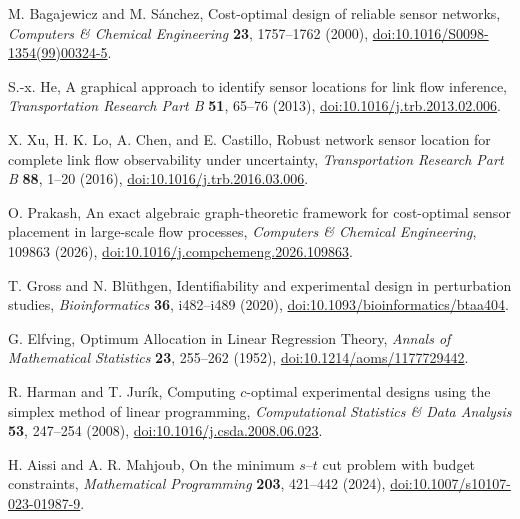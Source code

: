 
M. Bagajewicz and M. S\'anchez,
Cost-optimal design of reliable sensor networks,
\emph{Computers \& Chemical Engineering} \textbf{23}, 1757--1762 (2000),
\href{https://doi.org/10.1016/S0098-1354(99)00324-5}{doi:10.1016/S0098-1354(99)00324-5}.

S.-x. He,
A graphical approach to identify sensor locations for link flow inference,
\emph{Transportation Research Part B} \textbf{51}, 65--76 (2013),
\href{https://doi.org/10.1016/j.trb.2013.02.006}{doi:10.1016/j.trb.2013.02.006}.

X. Xu, H. K. Lo, A. Chen, and E. Castillo,
Robust network sensor location for complete link flow observability under uncertainty,
\emph{Transportation Research Part B} \textbf{88}, 1--20 (2016),
\href{https://doi.org/10.1016/j.trb.2016.03.006}{doi:10.1016/j.trb.2016.03.006}.

O. Prakash,
An exact algebraic graph-theoretic framework for cost-optimal sensor placement
in large-scale flow processes,
\emph{Computers \& Chemical Engineering}, 109863 (2026),
\href{https://doi.org/10.1016/j.compchemeng.2026.109863}{doi:10.1016/j.compchemeng.2026.109863}.

T. Gross and N. Bl\"uthgen,
Identifiability and experimental design in perturbation studies,
\emph{Bioinformatics} \textbf{36}, i482--i489 (2020),
\href{https://doi.org/10.1093/bioinformatics/btaa404}{doi:10.1093/bioinformatics/btaa404}.

G. Elfving,
Optimum Allocation in Linear Regression Theory,
\emph{Annals of Mathematical Statistics} \textbf{23}, 255--262 (1952),
\href{https://doi.org/10.1214/aoms/1177729442}{doi:10.1214/aoms/1177729442}.

R. Harman and T. Jur\'ik,
Computing $c$-optimal experimental designs using the simplex method of linear programming,
\emph{Computational Statistics \& Data Analysis} \textbf{53}, 247--254 (2008),
\href{https://doi.org/10.1016/j.csda.2008.06.023}{doi:10.1016/j.csda.2008.06.023}.

H. Aissi and A. R. Mahjoub,
On the minimum $s$--$t$ cut problem with budget constraints,
\emph{Mathematical Programming} \textbf{203}, 421--442 (2024),
\href{https://doi.org/10.1007/s10107-023-01987-9}{doi:10.1007/s10107-023-01987-9}.


